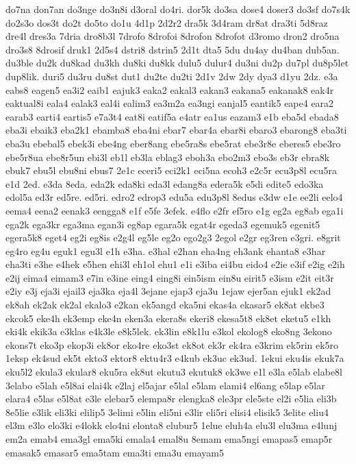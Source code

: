 {do7na don7an do3nge do3n8i d3oral do4ri. dor5k do3sa dose4 doser3 do3sf
do7s4k do2s3o dos3t do2t do5to do1u 4d1p 2d2r2 dra5k 3d4ram dr8at dra3ti
5d8raz dre4l dres3a 7dria dro8b3l 7drofo 8drofoi 8drofon 8drofot d3romo
dron2 dro5na dro3s8 8drosif druk1 2d5s4 dstri8 dstrin5 2d1t dta5 5du du4ay
du4ban dub5an. du3ble du2k du8kad du3kh du8ki du8kk dulu5 dulur4 du3ni
du2p du7pl du8p5let dup8lik. duri5 du3ru du8st dut1 du2te du2ti 2d1v 2dw
2dy dya3 d1yu 2dz. e3a eabs8 eagen5 ea3i2 eaib1 eajuk3 eaka2 eakal3 eakan3
eakana5 eakanak8 eak4r eaktual8i eala4 ealak3 eal4i ealim3 ea3m2a ea3ngi
eanjal5 eantik5 eape4 eara2 earab3 earti4 eartis5 e7a3t4 eat8i eatif5a
e4atr ea1us eazam3 e1b eba5d ebada8 eba3i ebaik3 eba2k1 ebamba8 eba4ni
ebar7 ebar4a ebar8i ebaro3 ebarong8 eba3ti eba3u ebebal5 ebek3i ebe4ng
eber8ang ebe5ra8s ebe5rat ebe3r8e eberes5 ebe3ro ebe5r8ua ebe8r5un ebi3l
eb1l eb3la eblag3 eboh3a ebo2m3 ebo3s eb3r ebra8k ebuk7 ebu5l ebu8ni ebus7
2e1c eceri5 eci2k1 eci5na ecoh3 e2c5r ecu3p8l ecu5ra e1d 2ed. e3da 8eda.
eda2k eda8ki eda3l edang8a edera5k e5di edite5 edo3ka edol5a ed3r ed5re.
ed5ri. edro2 edrop3 edu5a edu3p8l 8edus e3dw e1e ee2li eelo4 eema4 eena2
eenak3 eengga8 e1f e5fe 3efek. e4flo e2fr ef5ro e1g eg2a eg8ab ega1i ega2k
ega3kr ega3ma egan3i eg8ap egara5k egat4r egeda3 egemuk5 egenit5 egera5k8
eget4 eg2i eg8is e2g4l eg5le eg2o ego2g3 2egol e2gr eg3ren e3gri. e8grit
eg4ro eg4u eguk1 egu3l e1h e3ha. e3hal e2han eha4ng eh3ank ehanta8 e3har
eha3ti e3he e4hek e5hen ehi3l eh1ol ehu1 e1i e3iba ei4bu eido4 e2ie e3if
e2ig e2ih e2ij eima4 eimam3 e7in e3ine eing4 eing8i ein5ism ein8u eirit5
e3ism e2it eit3r e2iy e3j eja3i ejail3 eja3ka eja4l 3ejane ejap3 eja3u
1ejaw ejer5an ejuk1 ek2ad ek8ah ek2ak ek2al ekalo3 e2kan ek5angd eka5ni
ekas4a ekasar5 ek8at ekbe3 ekcok5 eke4h ek3emp eke4n eken3a ekera8s ekeri8
ekesa5t8 ek8et eketu5 e1kh eki4k ekik3a e3klas e4k3le e8k5lek. ek3lin
e8k1lu e3kol ekolog8 eko8ng 3ekono ekons7t eko3p ekop3i ek8or eko4re
eko3st ek8ot ek3r ek4ra e3krim ek5rin ek5ro 1eksp ek4sud ek5t ekto3 ektor8
ektu4r3 e4kub ek3uc ek3ud. 1ekui eku4is ekuk7a eku5l2 ekula3 ekular8
eku5ra ek8ut ekutu3 ekutuk8 ek3we e1l e3la e5lab elabe8l 3elabo e5lah
e5l8ai elai4k e2laj el5ajar e5lal e5lam elami4 el6ang e5lap e5lar elara4
e5las e5l8at e3le elebar5 elempa8r elengka8 ele3pr ele5ste el2i e5lia
eli3b 8e5lie e3lik eli3ki elilip5 3elimi e5lin eli5ni e3lir eli5ri elisi4
elisik5 3elite eliu4 el3m e3lo elo3ki e4lokk elo4ni elonta8 elubur5 1elue
eluh4a elu3l elu3ma e4lunj em2a emab4 ema3gl ema5ki emala4 emal8u 8emam
ema5ngi emapas5 emap5r emasak5 emasar5 ema5tam ema3ti ema3u emayam5
}
